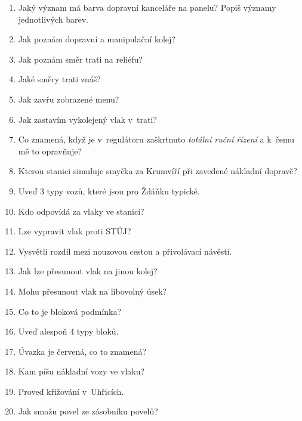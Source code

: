 \documentclass[12pt,a4paper]{article}
\begin{document}
\begin{enumerate}
	\item Jaký význam má barva dopravní kanceláře na panelu? Popiš významy jednotlivých barev.
	
	\item Jak poznám dopravní a manipulační kolej?
	
	\item Jak poznám směr trati na reliéfu?
	
	\item Jaké směry trati znáš?
	
	\item Jak zavřu zobrazené menu?
	
	\item Jak zastavím vykolejený vlak v~trati?
	
	\item Co znamená, když je v~regulátoru zaškrtnuto \textit{totální ruční řízení} a k~čemu mě to opravňuje?
	
	\item Kterou stanici simuluje smyčka za Krumvíří při zavedené nákladní dopravě?
	
	\item Uveď 3 typy vozů, které jsou pro Ždáňku typické.
	
	\item Kdo odpovídá za vlaky ve stanici?
	
	\item Lze vypravit vlak proti STŮJ?
	
	\item Vysvětli rozdíl mezi nouzovou cestou a přivolávací návěstí.
	
	\item Jak lze přesunout vlak na jinou kolej?

	\item Mohu přesunout vlak na libovolný úsek?
	
	\item Co to je bloková podmínka?
	
	\item Uveď alespoň 4 typy bloků.
	
	\item Úvazka je červená, co to znamená?
	
	\item Kam píšu nákladní vozy ve vlaku?
	
	\item Proveď křižování v~Uhřicích.
	
	\item Jak smažu povel ze zásobníku povelů?
	

\end{enumerate}
\end{document}
